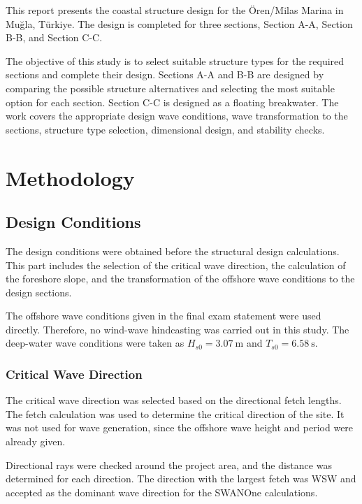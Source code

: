 \documentclass[a4paper, 11pt]{article}
\begin{document}
\hspace*{0.5cm}This report presents the coastal structure design for the Ören/Milas Marina in Muğla, Türkiye. The design is completed for three sections, Section A-A, Section B-B, and Section C-C.

The objective of this study is to select suitable structure types for the required sections and complete their design. Sections A-A and B-B are designed by comparing the possible structure alternatives and selecting the most suitable option for each section. Section C-C is designed as a floating breakwater. The work covers the appropriate design wave conditions, wave transformation to the sections, structure type selection, dimensional design, and stability checks.
\section{Methodology}

\subsection{Design Conditions}

\hspace*{0.5cm}The design conditions were obtained before the structural design calculations. This part includes the selection of the critical wave direction, the calculation of the foreshore slope, and the transformation of the offshore wave conditions to the design sections.

The offshore wave conditions given in the final exam statement were used directly. Therefore, no wind-wave hindcasting was carried out in this study. The deep-water wave conditions were taken as \(H_{s0}=3.07~\mathrm{m}\) and \(T_{s0}=6.58~\mathrm{s}\).

\subsubsection{Critical Wave Direction}

\hspace*{0.5cm} The critical wave direction was selected based on the directional fetch lengths. The fetch calculation was used to determine the critical direction of the site. It was not used for wave generation, since the offshore wave height and period were already given.

Directional rays were checked around the project area, and the distance was determined for each direction. The direction with the largest fetch was WSW and accepted as the dominant wave direction for the SWANOne calculations.
\end{document}
